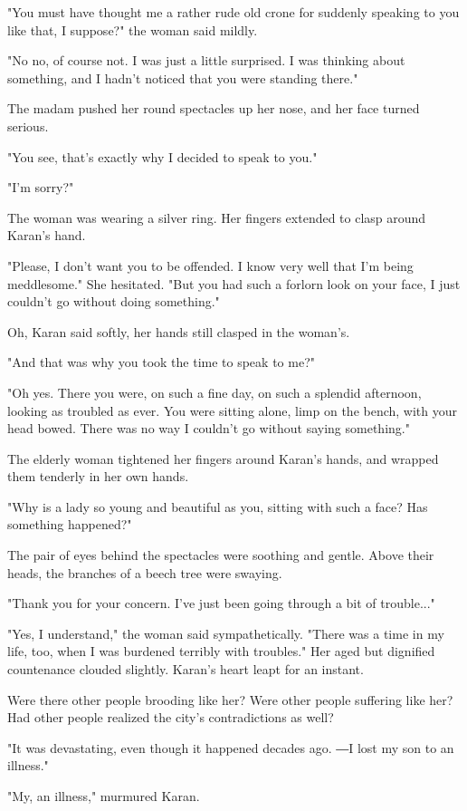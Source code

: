 "You must have thought me a rather rude old crone for suddenly speaking
to you like that, I suppose?" the woman said mildly.

"No no, of course not. I was just a little surprised. I was thinking
about something, and I hadn't noticed that you were standing there."

The madam pushed her round spectacles up her nose, and her face turned
serious.

"You see, that's exactly why I decided to speak to you."

"I'm sorry?"

The woman was wearing a silver ring. Her fingers extended to clasp
around Karan's hand.~

"Please, I don't want you to be offended. I know very well that I'm
being meddlesome." She hesitated. "But you had such a forlorn look on
your face, I just couldn't go without doing something."

Oh, Karan said softly, her hands still clasped in the woman's.

"And that was why you took the time to speak to me?"

"Oh yes. There you were, on such a fine day, on such a splendid
afternoon, looking as troubled as ever. You were sitting alone, limp on
the bench, with your head bowed. There was no way I couldn't go without
saying something."

The elderly woman tightened her fingers around Karan's hands, and
wrapped them tenderly in her own hands.

"Why is a lady so young and beautiful as you, sitting with such a face?
Has something happened?"

The pair of eyes behind the spectacles were soothing and gentle. Above
their heads, the branches of a beech tree were swaying.

"Thank you for your concern. I've just been going through a bit of
trouble..."

"Yes, I understand," the woman said sympathetically. "There was a time
in my life, too, when I was burdened terribly with troubles." Her aged
but dignified countenance clouded slightly. Karan's heart leapt for an
instant.

Were there other people brooding like her? Were other people suffering
like her? Had other people realized the city's contradictions as well?

"It was devastating, even though it happened decades ago. ―I lost my son
to an illness."

"My, an illness," murmured Karan.

